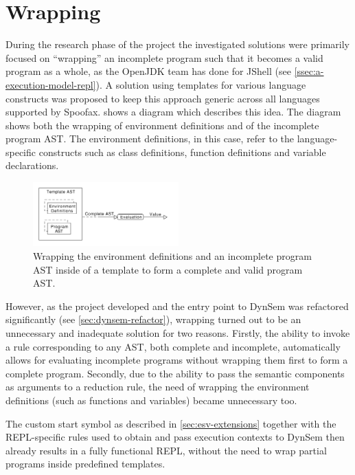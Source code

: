 \section{Wrapping}
\label{sec:wrapping}

During the research phase of the project the investigated solutions were
primarily focused on ``wrapping'' an incomplete program such that it becomes a
valid program as a whole, as the OpenJDK team has done for JShell (see
\cref{ssec:a-execution-model-repl}). A solution using templates for various
language constructs was proposed to keep this approach generic across all
languages supported by Spoofax.  shows a diagram which
describes this idea. The diagram shows both the wrapping of environment
definitions and of the incomplete program AST. The environment definitions, in
this case, refer to the language-specific constructs such as class definitions,
function definitions and variable declarations.

\begin{figure}[b]
  \centering
  \includegraphics[width=0.5\textwidth]{wrapping}
  \caption{Wrapping the environment definitions and an incomplete program AST
    inside of a template to form a complete and valid program AST.}
  \label{fig:wrapping}
\end{figure}

However, as the project developed and the entry point to DynSem was refactored
significantly (see \cref{sec:dynsem-refactor}), wrapping turned out to be an
unnecessary and inadequate solution for two reasons. Firstly, the ability to
invoke a rule corresponding to any AST, both complete and incomplete,
automatically allows for evaluating incomplete programs without wrapping them
first to form a complete program. Secondly, due to the ability to pass the
semantic components as arguments to a reduction rule, the need of wrapping the
environment definitions (such as functions and variables) became unnecessary
too.

The custom start symbol as described in \cref{sec:esv-extensions} together with
the REPL-specific rules used to obtain and pass execution contexts to DynSem
then already results in a fully functional REPL, without the need to wrap
partial programs inside predefined templates.

